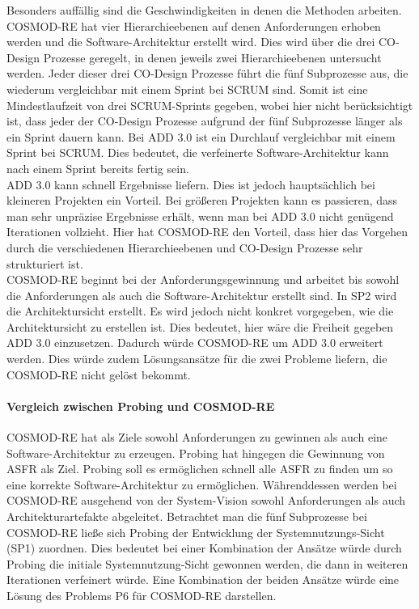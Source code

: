 Besonders auffällig sind die Geschwindigkeiten in denen die Methoden arbeiten. COSMOD-RE hat vier Hierarchieebenen auf denen Anforderungen erhoben werden und die Software-Architektur erstellt wird. Dies wird über die drei CO-Design Prozesse geregelt, in denen jeweils zwei Hierarchieebenen untersucht werden. Jeder dieser drei CO-Design Prozesse führt die fünf Subprozesse aus, die wiederum vergleichbar mit einem Sprint bei SCRUM sind. Somit ist eine Mindestlaufzeit von drei SCRUM-Sprints gegeben, wobei hier nicht berücksichtigt ist, dass jeder der CO-Design Prozesse aufgrund der fünf Subprozesse länger als ein Sprint dauern kann. Bei ADD 3.0 ist ein Durchlauf vergleichbar mit einem Sprint bei SCRUM. Dies bedeutet, die verfeinerte Software-Architektur kann nach einem Sprint bereits fertig sein.\\

ADD 3.0 kann schnell Ergebnisse liefern. Dies ist jedoch hauptsächlich bei kleineren Projekten ein Vorteil. Bei größeren Projekten kann es passieren, dass man sehr unpräzise Ergebnisse erhält, wenn man bei ADD 3.0 nicht genügend Iterationen vollzieht. Hier hat COSMOD-RE den Vorteil, dass hier das Vorgehen durch die verschiedenen Hierarchieebenen und CO-Design Prozesse sehr strukturiert ist.\\

COSMOD-RE beginnt bei der Anforderungsgewinnung und arbeitet bis sowohl die Anforderungen als auch die Software-Architektur erstellt sind. In SP2 wird die Architektursicht erstellt. Es wird jedoch nicht konkret vorgegeben, wie die Architektursicht zu erstellen ist. Dies bedeutet, hier wäre die Freiheit gegeben ADD 3.0 einzusetzen. Dadurch würde COSMOD-RE um ADD 3.0 erweitert werden. Dies würde zudem Lösungsansätze für die zwei Probleme liefern, die COSMOD-RE nicht gelöst bekommt.\\

\paragraph{Vergleich zwischen Probing und  COSMOD-RE}
COSMOD-RE hat als Ziele sowohl Anforderungen zu gewinnen als auch eine Software-Architektur zu erzeugen. Probing hat hingegen die Gewinnung von ASFR als Ziel. Probing soll es ermöglichen schnell alle ASFR zu finden um so eine korrekte Software-Architektur zu ermöglichen. Währenddessen werden bei COSMOD-RE ausgehend von der System-Vision sowohl Anforderungen als auch Architekturartefakte abgeleitet. Betrachtet man die fünf Subprozesse bei COSMOD-RE ließe sich Probing der Entwicklung der Systemnutzungs-Sicht (SP1) zuordnen. Dies bedeutet bei einer Kombination der Ansätze würde durch Probing die initiale Systemnutzung-Sicht gewonnen werden, die dann in weiteren Iterationen verfeinert würde. Eine Kombination der beiden Ansätze würde eine Lösung des Problems P6 für COSMOD-RE darstellen.\\
